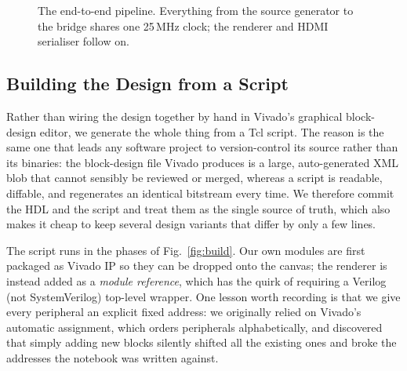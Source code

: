 \documentclass[11pt]{article}
\begin{document}
\begin{figure}[h]
\centering
{}
\caption{The end-to-end pipeline. Everything from the source generator to the
bridge shares one 25\,MHz clock; the renderer and HDMI serialiser follow on.}
\label{fig:pipeline}
\end{figure}

\subsection{Building the Design from a Script}

Rather than wiring the design together by hand in Vivado's graphical
block-design editor, we generate the whole thing from a Tcl script. The reason
is the same one that leads any software project to version-control its source
rather than its binaries: the block-design file Vivado produces is a large,
auto-generated XML blob that cannot sensibly be reviewed or merged, whereas a
script is readable, diffable, and regenerates an identical bitstream every time.
We therefore commit the HDL and the script and treat them as the single source
of truth, which also makes it cheap to keep several design variants that differ
by only a few lines.

The script runs in the phases of Fig.~\ref{fig:build}. Our own modules are first
packaged as Vivado IP so they can be dropped onto the canvas; the renderer is
instead added as a \emph{module reference}, which has the quirk of requiring a
Verilog (not SystemVerilog) top-level wrapper. One lesson worth recording is
that we give every peripheral an explicit fixed address: we originally relied on
Vivado's automatic assignment, which orders peripherals alphabetically, and
discovered that simply adding new blocks silently shifted all the existing ones
and broke the addresses the notebook was written against.
\end{document}
